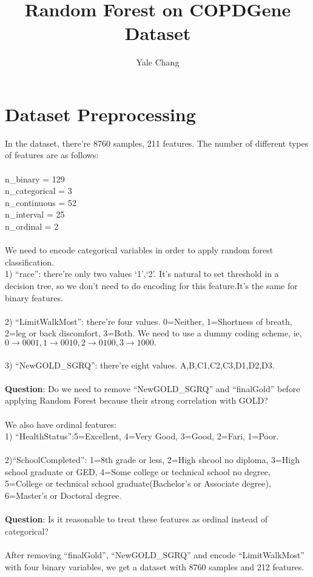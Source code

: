 \documentclass[11pt]{article}
\title{\textbf{Random Forest on COPDGene Dataset}}
\author{Yale Chang}
\date{}
\begin{document}
\maketitle

\section{Dataset Preprocessing}
In the dataset, there're 8760 samples, 211 features.
The number of different types of features are as follows:\\
\\
n\_binary = 129\\
n\_categorical = 3\\
n\_continuous = 52\\
n\_interval = 25\\
n\_ordinal = 2\\
\\
We need to encode categorical variables in order to apply random forest classification.\\
1) ``race'': there're only two values `1',`2'. It's natural to set threshold in a decision tree, so we don't need to do encoding for this feature.It's the same for binary features.\\
\\
2) ``LimitWalkMost'': there're four values. 0=Neither, 1=Shortness of breath, 2=leg or back discomfort, 3=Both. We need to use a dummy coding scheme, ie, $0\rightarrow 0001, 1\rightarrow 0010, 2\rightarrow 0100, 3\rightarrow 1000.$\\
\\
3) ``NewGOLD\_SGRQ'': there're eight values. A,B,C1,C2,C3,D1,D2,D3.\\
\\
\textbf{Question}: Do we need to remove ``NewGOLD\_SGRQ'' and ``finalGold'' before applying Random Forest because their strong correlation with GOLD?\\
\\
We also have ordinal features:\\
1) ``HealthStatus'':5=Excellent, 4=Very Good, 3=Good, 2=Fari, 1=Poor.\\
\\
2)``SchoolCompleted'': 1=8th grade or less, 2=High shcool no diploma, 3=High school graduate or GED, 4=Some college or technical school no degree, 5=College or technical school graduate(Bachelor's or Associate degree), 6=Master's or Doctoral degree.\\
\\
\textbf{Question}: Is it reasonable to treat these features as ordinal instead of categorical?\\
\\

After removing ``finalGold'', ``NewGOLD\_SGRQ'' and encode ``LimitWalkMost'' with four binary variables, we get a dataset with 8760 samples and 212 features.
\end{document}
